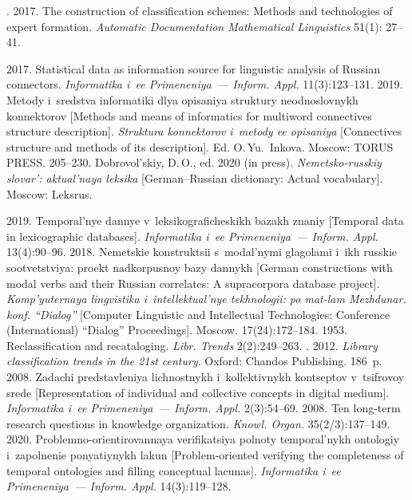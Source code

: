 \begin{multicols}{2}
{{\begin{thebibliography}{99}
. 2017. The construction of classification 
schemes: Methods and technologies of expert formation. \textit{Automatic Documentation Mathematical Linguistics} 51(1): 27--41.

 2017. Statistical data as information source for linguistic analysis of 
Russian connectors. \textit{Informatika i~ee Primeneniya~--- Inform. Appl.} 11(3):123--131.
 2019. Metody i~sredstva informatiki dlya opisaniya 
struktury neodnoslovnykh konnektorov [Methods and means of informatics for multiword connectives 
structure description]. \textit{Struktura konnektorov i~metody ee opisaniya} [Connectives structure and 
methods of its description]. Ed. O.\,Yu.~Inkova. Moscow: TORUS PRESS. 205--230.
Dobrovol'skiy, D.\,O., ed. 2020 (in press). \textit{Nemetsko-russkiy slovar': aktual'naya leksika} 
[German--Russian dictionary: Actual vocabulary]. Moscow: Leksrus.

 2019. Temporal'nye dannye 
v~leksikograficheskikh bazakh znaniy [Temporal data in lexicographic databases]. \textit{Informatika i~ee 
Primeneniya~--- Inform. Appl.} 13(4):90--96.
 2018. Nemetskie konstruktsii s~modal'nymi 
glagolami i~ikh russkie sootvetstviya: proekt nadkorpusnoy bazy dannykh [German constructions with 
modal verbs and their Russian correlates: A supracorpora database project]. \textit{Komp'yuternaya 
lingvistika i~intellektual'nye tekhnologii: po mat-lam Mezhdunar. konf. ``Dialog''} [Computer Linguistic 
and Intellectual Technologies: Conference (International) ``Dialog'' Proceedings]. Moscow. 17(24):172--184.
 1953. Reclassification and recataloging. \textit{Libr. Trends} 
2(2):249--263.
. 2012. \textit{Library classification trends in the 21st century}. Oxford: Chandos 
Publishing. 186~p.
 2008. Zadachi predstavleniya lichnostnykh 
i~kollektivnykh kontseptov v~tsifrovoy srede [Representation of individual and collective concepts in digital 
medium]. \textit{Informatika i~ee Primeneniya~--- Inform. Appl.} 2(3):54--69.
 2008. Ten long-term research questions in knowledge organization. \textit{Knowl. 
Organ.} 35(2/3):137--149.
 2020. Problemno-orientirovannaya ve\-ri\-fi\-ka\-tsiya polnoty temporal'nykh ontologiy 
i~zapolnenie ponyatiynykh lakun [Problem-oriented verifying the completeness of temporal ontologies and 
filling conceptual lacunas]. \textit{Informatika i~ee Primeneniya~--- Inform. Appl.} 14(3):119--128.
\end{thebibliography}

 }
 }

\end{multicols}

